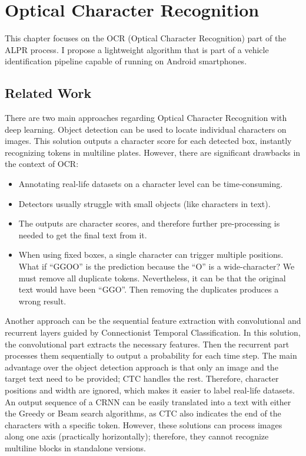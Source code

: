 \chapter{Optical Character Recognition}

This chapter focuses on the OCR (Optical Character Recognition) part of the ALPR process. I propose a lightweight algorithm that is part of a vehicle identification pipeline capable of running on Android smartphones.

\section{Related Work}

There are two main approaches regarding Optical Character Recognition with deep learning. Object detection can be used to locate individual characters on images. This solution outputs a character score for each detected box, instantly recognizing tokens in multiline plates. However, there are significant drawbacks in the context of OCR\cite{CTCexp}:

\begin{itemize}
  \item Annotating real-life datasets on a character level can be time-consuming.
  \item Detectors usually struggle with small objects (like characters in text).
  \item The outputs are character scores, and therefore further pre-processing is needed to get the final text from it.
  \item When using fixed boxes, a single character can trigger multiple positions. What if ``GGOO'' is the prediction because the ``O'' is a wide-character? We must remove all duplicate tokens. Nevertheless, it can be that the original text would have been ``GGO''. Then removing the duplicates produces a wrong result.
\end{itemize}

Another approach can be the sequential feature extraction with convolutional and recurrent layers guided by Connectionist Temporal Classification\cite{CTC}. In this solution, the convolutional part extracts the necessary features. Then the recurrent part processes them sequentially to output a probability for each time step. The main advantage over the object detection approach is that only an image and the target text need to be provided; CTC handles the rest. Therefore, character positions and width are ignored, which makes it easier to label real-life datasets. An output sequence of a CRNN can be easily translated into a text with either the Greedy or Beam search algorithms, as CTC also indicates the end of the characters with a specific token. However, these solutions can process images along one axis (practically horizontally); therefore, they cannot recognize multiline blocks in standalone versions.

